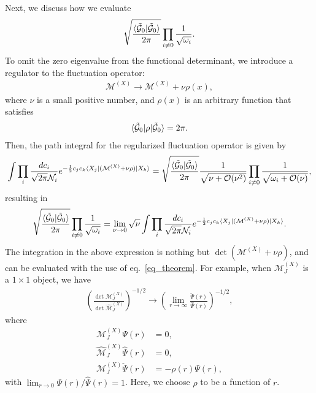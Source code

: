 \documentclass[12pt]{article}
\begin{document}
Next, we discuss how we evaluate
\begin{align*}
  \sqrt{\frac{\langle\tilde{{\cal G}}_0|\tilde{{\cal G}}_0\rangle}{2\pi}}
  \prod_{i\neq0}\frac{1}{\sqrt{\omega_i}}.
\end{align*}
To omit the zero eigenvalue from the functional determinant, we
introduce a regulator to the fluctuation operator:
\begin{align}
  \mathcal M^{(X)}\to\mathcal M^{(X)} + \nu \rho(x),
\end{align}
where $\nu$ is a small positive number, and $\rho(x)$ is an arbitrary
function that satisfies
\begin{align}
  \langle \tilde{{\cal G}}_0|\rho|\tilde{{\cal G}}_0\rangle = 2\pi.
  \label{eq_normalization}
\end{align}
Then, the path integral for the regularized fluctuation operator is
given by
\begin{align}
  \int \prod_{i}\frac{dc_i}{\sqrt{2\pi}\mathcal N_i}
  e^{-\frac{1}{2}c_jc_k\langle X_j|({\mathcal M}^{(X)}+\nu \rho)|X_k\rangle}
  = \sqrt{\frac{\langle\tilde{{\cal G}}_0|\tilde{{\cal G}}_0\rangle}{2\pi}}
  \frac{1}{\sqrt{\nu+\mathcal O(\nu^2)}}
  \prod_{i\neq 0}\frac{1}{\sqrt{\omega_i+\mathcal O(\nu)}},
\end{align}
resulting in
\begin{align}
  \sqrt{\frac{\langle\tilde{{\cal G}}_0|\tilde{{\cal G}}_0\rangle}{2\pi}}
  \prod_{i\neq0}\frac{1}{\sqrt{\omega_i}}
  = \lim_{\nu\to0}\sqrt{\nu}\int \prod_{i}\frac{dc_i}{\sqrt{2\pi}\mathcal N_i}
  e^{-\frac{1}{2}c_jc_k\langle X_j|({\mathcal M}^{(X)}+\nu \rho)|X_k\rangle}.
\end{align}
The integration in the above expression is nothing but $\det ({\mathcal
M}^{(X)}+\nu \rho)$, and can be evaluated with the use of
eq.~\eqref{eq_theorem}.  For example, when $\mathcal M_J^{(X)}$ is a
$1\times1$ object, we have
\begin{align}
 \left(
  \frac{\det\mathcal M^{(X)}_J}{\det\widehat{\mathcal M}^{(X)}_J}
 \right)^{-1/2}
 \to
 \left(
   \lim_{r\to\infty}\frac{\check\Psi(r)}{\hat\Psi(r)}
 \right)^{-1/2},
 \label{eq_detPrime}
\end{align}
where
\begin{align}
 \mathcal M_J^{(X)}\Psi(r)               & = 0,                  \\
 \widehat{\mathcal M}_J^{(X)}\hat\Psi(r) & = 0,                  \\
 \mathcal M_J^{(X)}\check\Psi(r)         & = 
 - \rho(r)\Psi(r)
 \label{eq_detPrimeFunc},
\end{align}
with $\lim_{r\to0}\Psi(r)/\hat\Psi(r) = 1$.  Here, we choose $\rho$ to
be a function of $r$.
%
\end{document}
